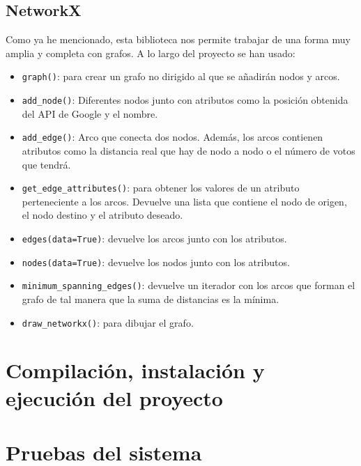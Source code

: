 \subsection{NetworkX}
Como ya he mencionado, esta biblioteca nos permite trabajar de una forma muy amplia y completa con grafos. A lo largo del proyecto se han usado:
\begin{itemize}
	\item \texttt{graph()}: para crear un grafo no dirigido al que se añadirán nodos y arcos.
	\item \texttt{add\_node()}: Diferentes nodos junto con atributos como la posición obtenida del API de Google y el nombre.
	\item \texttt{add\_edge()}: Arco que conecta dos nodos. Además, los arcos contienen atributos como la distancia real que hay de nodo a nodo o el número de votos que tendrá.
	\item \texttt{get\_edge\_attributes()}: para obtener los valores de un atributo perteneciente a los arcos. Devuelve una lista que contiene el nodo de origen, el nodo destino y el atributo deseado.
	\item \texttt{edges(data=True)}: devuelve los arcos junto con los atributos.
	\item \texttt{nodes(data=True)}: devuelve los nodos junto con los atributos.
	\item \texttt{minimum\_spanning\_edges()}: devuelve un iterador con los arcos que forman el grafo de tal manera que la suma de distancias es la mínima.
	\item \texttt{draw\_networkx()}: para dibujar el grafo.
\end{itemize}





\section{Compilación, instalación y ejecución del proyecto}


\section{Pruebas del sistema}
